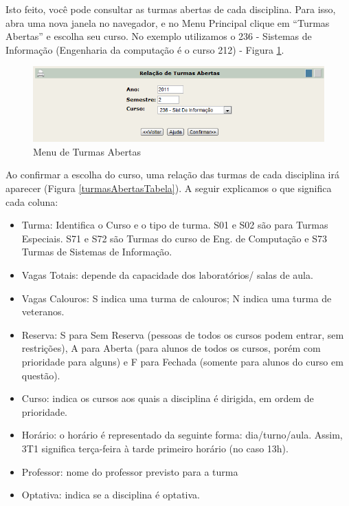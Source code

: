 \documentclass[a4paper,12pt,openany]{article}
\begin{document}
Isto feito, você pode consultar as turmas abertas de cada disciplina. Para isso, abra uma nova janela no navegador, e no Menu Principal clique em ``Turmas Abertas'' e escolha seu curso. No exemplo utilizamos o 236 - Sistemas de Informação (Engenharia da computação é o curso 212) - Figura \ref{turmasAbertasMenu}.

	\begin{figure}[ht!]  \centering
		\includegraphics[scale=0.3]{Turmas_Abertas_Menu.png}
		\caption{Menu de Turmas Abertas}
		\label{turmasAbertasMenu}
	\end{figure}

Ao confirmar a escolha do curso, uma relação das turmas de cada disciplina irá aparecer (Figura \ref{turmasAbertasTabela}). A seguir explicamos o que significa cada coluna:

\begin{itemize}
\item Turma: Identifica o Curso e o tipo de turma. S01 e S02 são para Turmas Especiais. S71 e S72 são Turmas do curso de Eng. de Computação e S73 Turmas de Sistemas de Informação.

\item Vagas Totais: depende da capacidade dos laboratórios/ salas de aula.

\item Vagas Calouros: S indica uma turma de calouros; N indica uma turma de veteranos.

\item Reserva: S para Sem Reserva (pessoas de todos os cursos podem entrar, sem restrições), A para Aberta (para alunos de todos os cursos, porém com prioridade para alguns) e F para Fechada (somente para alunos do curso em questão).

\item Curso: indica os cursos aos quais a disciplina é dirigida, em ordem de prioridade.

\item Horário: o horário é representado da seguinte forma: dia/turno/aula. Assim, 3T1 significa terça-feira à tarde primeiro horário (no caso 13h).

\item Professor: nome do professor previsto para a turma

\item Optativa: indica se a disciplina é optativa.

\end{itemize}
\end{document}
